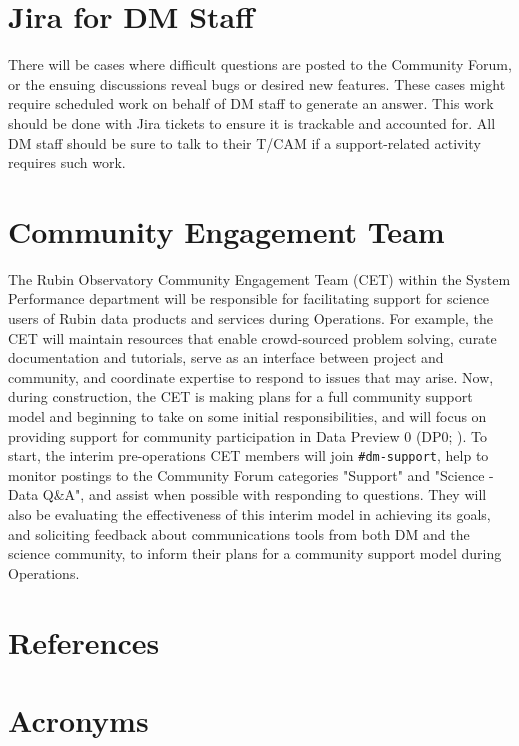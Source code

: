 \documentclass[DM,lsstdraft,authoryear,toc]{lsstdoc}
\begin{document}
\section{Jira for DM Staff}\label{sec:jira}

There will be cases where difficult questions are posted to the Community Forum, or the ensuing discussions reveal bugs or desired new features.
These cases might require scheduled work on behalf of DM staff to generate an answer.
This work should be done with Jira tickets to ensure it is trackable and accounted for.
All DM staff should be sure to talk to their T/CAM if a support-related activity requires such work.

\section{Community Engagement Team}\label{sec:cet}

The Rubin Observatory Community Engagement Team (CET) within the System Performance department will be responsible for facilitating support for science users of Rubin data products and services during Operations.
For example, the CET will maintain resources that enable crowd-sourced problem solving, curate documentation and tutorials, serve as an interface between project and community, and coordinate expertise to respond to issues that may arise.
Now, during construction, the CET is making plans for a full community support model and beginning to take on some initial responsibilities, and will focus on providing support for community participation in Data Preview 0 (DP0; ).
To start, the interim pre-operations CET members will join {\tt \#dm-support}, help to monitor postings to the Community Forum categories "Support" and "Science - Data Q\&A", and assist when possible with responding to questions.
They will also be evaluating the effectiveness of this interim model in achieving its goals, and soliciting feedback about communications tools from both DM and the science community, to inform their plans for a community support model during Operations.

\appendix
\section{References} \label{sec:bib}
\renewcommand{\refname}{} %


\section{Acronyms} \label{sec:acronyms}

\end{document}

